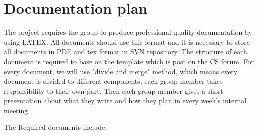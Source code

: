 \documentclass[11pt, a4paper]{report}
\begin{document}
\section{Documentation plan}
The project requires the group to produce professional quality documentation by using LATEX. All documents should use this format and it is necessary to store all documents in PDF and tex format in SVN repository. The structure of each document is required to base on the template which is post on the CS forum. For every document, we will use "divide and merge" method, which means every document is divided to different components, each group member takes responsibility to their own part. Then each group member gives a short presentation about what they write and how they plan in every week's internal meeting.

The Required documents include:
\end{document}
